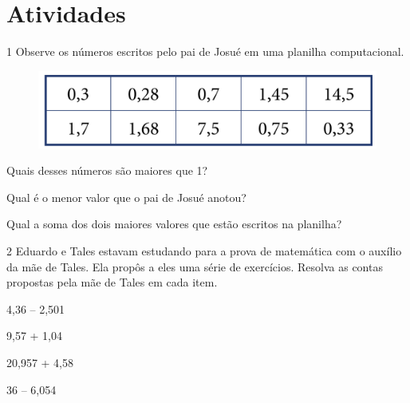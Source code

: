 \pagebreak
\section*{Atividades}

\num{1} Observe os números escritos pelo pai de Josué em uma planilha computacional.

\begin{figure}[htpb!]
\centering
\includegraphics[width=.6\textwidth]{../ilustracoes/MAT5/SAEB_5ANO_MAT_figura86.png}
\end{figure}

\begin{escolha}
\item
  Quais desses números são maiores que 1?


\item
  Qual é o menor valor que o pai de Josué anotou?


\item
  Qual a soma dos dois maiores valores que estão escritos na planilha?

\end{escolha}


\num{2} Eduardo e Tales estavam estudando para a prova de matemática com o
auxílio da mãe de Tales. Ela propôs a eles uma série de exercícios.
Resolva as contas propostas pela mãe de Tales em cada item.

\begin{escolha}
\item
  4,36 – 2,501

\bigskip

\item
  9,57 + 1,04

\bigskip

\item
  20,957 + 4,58

\bigskip

\item
  36 – 6,054

\bigskip
\end{escolha}

